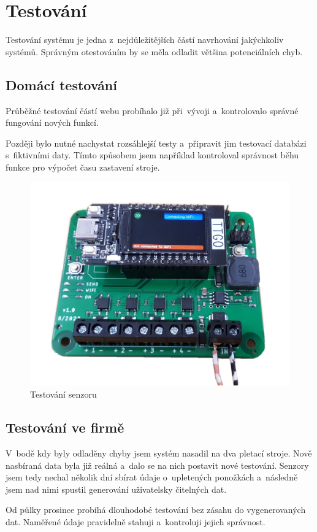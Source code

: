 \chapter{Testování}
Testování systému je jedna z~nejdůležitějších částí navrhování jakýchkoliv systémů.
Správným otestováním by se měla odladit většina potenciálních chyb.


\fxnote[author=JPA]{\textcolor{mygreen}{Měli bychom probrat tuto kapitolu}}


\section{Domácí testování}
Průběžné testování částí webu probíhalo již při~vývoji a~kontrolovalo správné fungování nových funkcí.

Později bylo nutné nachystat rozsáhlejší testy a~připravit jim testovací databázi s~fiktivními daty.
Tímto způsobem jsem například kontroloval správnost běhu funkce pro výpočet času zastavení stroje.

\begin{figure}[htbp]
    \centering
    \includegraphics[width=\textwidth]{img/Testovani.png}
    \caption{Testování senzoru}
    \label{fig:SenzorNaStroji}
\end{figure}

\section{Testování ve firmě}
V~bodě kdy byly odladěny chyby jsem systém nasadil na dva pletací stroje.
Nově nasbíraná data byla již reálná a~dalo se na nich postavit nové testování.
Senzory jsem tedy nechal několik dní sbírat údaje o~upletených ponožkách a~následně jsem nad nimi spustil generování uživatelsky čitelných dat.

Od půlky prosince probíhá dlouhodobé testování bez zásahu do vygenerovaných dat. Naměřené údaje pravidelně stahuji a~kontroluji jejich správnost.

\newpage